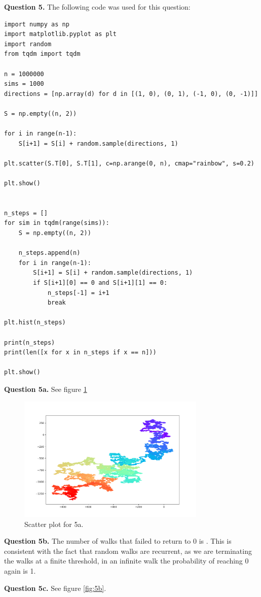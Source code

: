 \documentclass[letterpaper, reqno,11pt]{article}
\begin{document}
{\medskip\noindent\bf Question 5.} The following code was used for this question: 
\begin{lstlisting}
import numpy as np
import matplotlib.pyplot as plt
import random
from tqdm import tqdm

n = 1000000
sims = 1000
directions = [np.array(d) for d in [(1, 0), (0, 1), (-1, 0), (0, -1)]]

S = np.empty((n, 2))

for i in range(n-1):
    S[i+1] = S[i] + random.sample(directions, 1)

plt.scatter(S.T[0], S.T[1], c=np.arange(0, n), cmap="rainbow", s=0.2)

plt.show()


n_steps = []
for sim in tqdm(range(sims)):
    S = np.empty((n, 2))

    n_steps.append(n)
    for i in range(n-1):
        S[i+1] = S[i] + random.sample(directions, 1)
        if S[i+1][0] == 0 and S[i+1][1] == 0:
            n_steps[-1] = i+1
            break

plt.hist(n_steps)

print(n_steps)
print(len([x for x in n_steps if x == n]))

plt.show()
\end{lstlisting}

{\medskip\noindent\bf Question 5a.} See figure \ref{fig:5a}

\begin{figure}[htpb]
    \centering
    \includegraphics[width=0.8\textwidth]{5a}
    \caption{Scatter plot for 5a.}
    \label{fig:5a}
\end{figure}

{\medskip\noindent\bf Question 5b.} The number of walks that failed to return to 0 is . This is consistent with the fact that random walks are recurrent, as we are terminating the walks at a finite threshold, in an infinite walk the probability of reaching 0 again is 1. 

{\medskip\noindent\bf Question 5c.} See figure \ref{fig:5b}.
\end{document}
